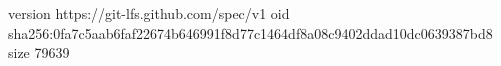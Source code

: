 version https://git-lfs.github.com/spec/v1
oid sha256:0fa7c5aab6faf22674b646991f8d77c1464df8a08c9402ddad10dc0639387bd8
size 79639
